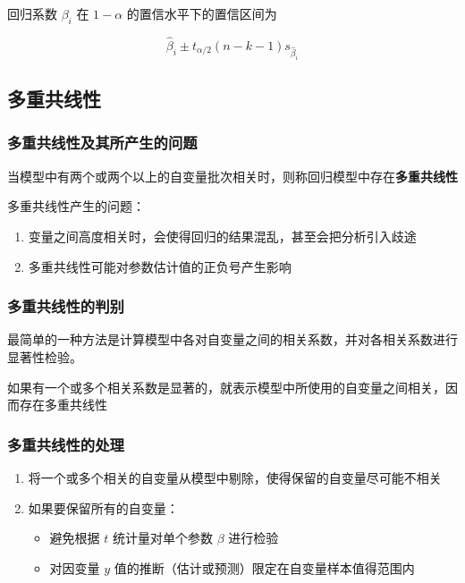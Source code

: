 \documentclass[UTF8,10pt]{book}
\begin{document}
回归系数 \(\beta_i\) 在 \(1-\alpha\) 的置信水平下的置信区间为

\[\hat{\beta}_i \pm t_{\alpha /2}(n-k-1)s_{\hat{\beta}_i}\]

\subsection{多重共线性}\label{header-n258}

\subsubsection{多重共线性及其所产生的问题}\label{header-n259}

当模型中有两个或两个以上的自变量批次相关时，则称回归模型中存在\textbf{多重共线性}

多重共线性产生的问题：

\begin{enumerate}
	\def\labelenumi{\arabic{enumi}.}
	\item
	变量之间高度相关时，会使得回归的结果混乱，甚至会把分析引入歧途
	\item
	多重共线性可能对参数估计值的正负号产生影响
\end{enumerate}

\subsubsection{多重共线性的判别}\label{header-n267}

最简单的一种方法是计算模型中各对自变量之间的相关系数，并对各相关系数进行显著性检验。

{\kaishu 如果有一个或多个相关系数是显著的，就表示模型中所使用的自变量之间相关，因而存在多重共线性}

\subsubsection{多重共线性的处理}\label{header-n269}

\begin{enumerate}
	\def\labelenumi{\arabic{enumi}.}
	\item
	将一个或多个相关的自变量从模型中剔除，使得保留的自变量尽可能不相关
	\item
	如果要保留所有的自变量：
	
	\begin{itemize}
		\item
		避免根据 \(t\) 统计量对单个参数 \(\beta\) 进行检验
		\item
		对因变量 \(y\) 值的推断（估计或预测）限定在自变量样本值得范围内
	\end{itemize}
\end{enumerate}
\end{document}
